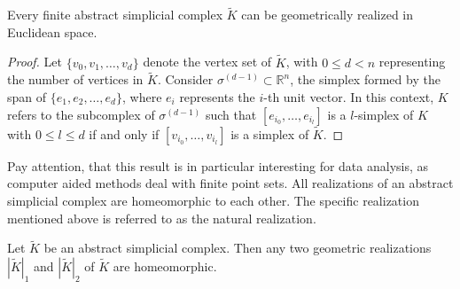 \begin{proposition}
	Every finite abstract simplicial complex $\tilde{K}$ can be geometrically realized
	in Euclidean space.
\end{proposition}

\begin{proof}
	Let $\{v_{0}, v_{1}, \ldots, v_{d}\}$ denote the vertex set of $\tilde{K}$,
	with $0 \leq d < n$ representing the number of vertices in $\tilde{K}$. Consider $\sigma^{(d-1)}
	\subset \mathbb{R}^{n}$, the simplex formed by the span of
	$\{e_{1}, e_{2}, \ldots, e_{d}\}$, where $e_{i}$ represents the $i$-th unit vector.
	In this context, $K$ refers to the subcomplex of $\sigma^{(d-1)}$ such that $[e
	_{i_0}, \ldots, e_{i_l}]$ is a $l$-simplex of $K$ with $0 \leq l \leq d$ if and only if $[v_{i_0}, \ldots
	, v_{i_l}]$ is a simplex of $\tilde{K}$.
\end{proof}

Pay attention, that this result is in particular interesting for data analysis, as computer aided methods deal with finite point sets. All realizations of an abstract simplicial complex are homeomorphic to each other.
The specific realization mentioned above is referred to as the natural
realization.

\begin{proposition}
	Let $\tilde{K}$ be an abstract simplicial complex. Then any two geometric
	realizations $|\tilde{K}|_{1}$ and $|\tilde{K}|_{2}$ of $\tilde{K}$ are
	homeomorphic.
\end{proposition}

